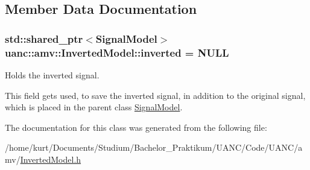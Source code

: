 \subsection{Member Data Documentation}
\subsubsection[{\texorpdfstring{inverted}{inverted}}]{\setlength{\rightskip}{0pt plus 5cm}std\+::shared\+\_\+ptr$<${\bf Signal\+Model}$>$ uanc\+::amv\+::\+Inverted\+Model\+::inverted = N\+U\+LL}\hypertarget{classuanc_1_1amv_1_1_inverted_model_a739f026c7b9bd28add6c8b04c4976844}{}\label{classuanc_1_1amv_1_1_inverted_model_a739f026c7b9bd28add6c8b04c4976844}


Holds the inverted signal. 

This field gets used, to save the inverted signal, in addition to the original signal, which is placed in the parent class \hyperlink{classuanc_1_1amv_1_1_signal_model}{Signal\+Model}. 

The documentation for this class was generated from the following file\+:\begin{DoxyCompactItemize}
\item 
/home/kurt/\+Documents/\+Studium/\+Bachelor\+\_\+\+Praktikum/\+U\+A\+N\+C/\+Code/\+U\+A\+N\+C/amv/\hyperlink{_inverted_model_8h}{Inverted\+Model.\+h}\end{DoxyCompactItemize}
